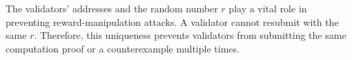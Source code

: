 \documentclass[runningheads]{llncs}
\begin{document}
The validators' addresses and the random number $r$ play a vital role in preventing reward-manipulation attacks. A validator cannot resubmit with the same $r$. Therefore, this uniqueness prevents validators from submitting the same computation proof or a counterexample multiple times.

\end{document}
